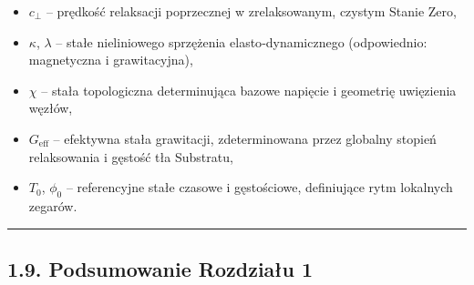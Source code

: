 \documentclass[
  letterpaper,
  DIV=11,
  numbers=noendperiod]{scrartcl}
\providecommand{\tightlist}{%
  \setlength{\itemsep}{0pt}\setlength{\parskip}{0pt}}
\numberwithin{equation}{subsection}
\begin{document}
\begin{itemize}
\tightlist
\item
  \(c_{\perp}\) -- prędkość relaksacji poprzecznej w zrelaksowanym,
  czystym Stanie Zero,
\item
  \(\kappa\), \(\lambda\) -- stałe nieliniowego sprzężenia
  elasto‑dynamicznego (odpowiednio: magnetyczna i grawitacyjna),
\item
  \(\chi\) -- stała topologiczna determinująca bazowe napięcie i
  geometrię uwięzienia węzłów,
\item
  \(G_{\text{eff}}\) -- efektywna stała grawitacji, zdeterminowana przez
  globalny stopień relaksowania i gęstość tła Substratu,
\item
  \(T_0\), \(\phi_0\) -- referencyjne stałe czasowe i gęstościowe,
  definiujące rytm lokalnych zegarów.
\end{itemize}

\begin{center}\rule{0.5\linewidth}{0.5pt}\end{center}

\subsection{1.9. Podsumowanie Rozdziału
1}\label{podsumowanie-rozdziaux142u-1}
\end{document}
